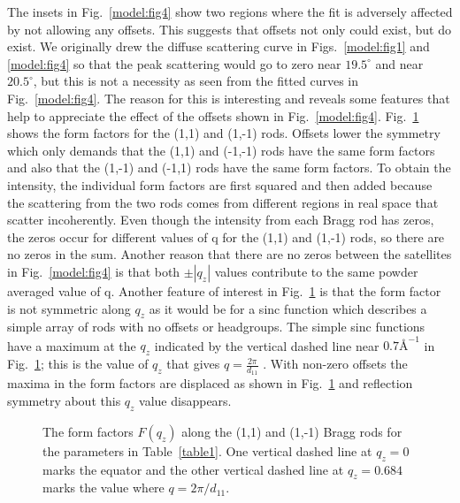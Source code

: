 The insets in Fig.\ \ref{model:fig4} show two regions
where the fit is adversely affected by not allowing any offsets.
This suggests that offsets not only could exist, but do exist.
We originally drew the diffuse scattering curve in Figs.\ \ref{model:fig1} and \ref{model:fig4}
so that the peak scattering would go to zero near $19.5^{\circ}$
and near $20.5^{\circ}$, but this is not a necessity as seen from the fitted
curves in Fig.\ \ref{model:fig4}.  The reason for this is interesting and reveals some
features that help to appreciate the effect of the offsets shown in
Fig.\ \ref{model:fig4}.  Fig.\ \ref{model:fig5} shows the form factors for the (1,1) and (1,-1) rods.
Offsets lower the symmetry which only demands
that the (1,1) and (-1,-1) rods have the same form factors and also
that the (1,-1) and (-1,1) rods have the same form factors.  To
obtain the intensity, the individual form factors are first squared
and then added because the scattering from the two rods comes from
different regions in real space that scatter incoherently.  Even
though the intensity from each Bragg rod has zeros, the zeros occur
for different values of q for the (1,1) and (1,-1) rods,
so there are no zeros in the sum.  Another reason
that there are no zeros between the satellites in Fig.\ \ref{model:fig4} is that
both $\pm |q_{z}|$ values contribute to the same
powder averaged value of q.
Another feature of interest in Fig.\ \ref{model:fig5} is that the form factor is not
symmetric along $q_{z}$ as it would be for a sinc function which describes a
simple array of rods with no offsets or headgroups.  The simple sinc functions
have a maximum at the $q_{z}$ indicated by the vertical dashed line near
${0.7\mbox{\AA}}^{-1}$ in Fig.\ \ref{model:fig5}; this is the value of $q_{z}$ that gives 
$q=\frac{2 \pi}{d_{11}}$ . With non-zero offsets the maxima in the form factors 
are displaced as shown in Fig.\ \ref{model:fig5} and reflection symmetry about this 
$q_{z}$ value disappears.

\begin{figure}[ht]
\centerline {}
\caption{The form factors $F(q_{z})$ along the (1,1) and (1,-1) Bragg rods
for the parameters in Table\ \protect\ref{table1}.  One vertical dashed
line at $q_{z}=0$ marks the
equator and the other vertical dashed line at $q_{z}=0.684$ marks the
value where $q=2 \pi / d_{11}$.
\label{model:fig5}}
\end{figure}

